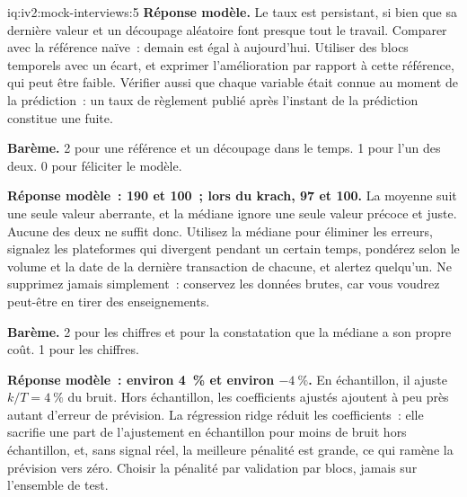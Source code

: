 \begin{solution}{iq:iv2:mock-interviews:5}
\ivstop
\textbf{Réponse modèle.} Le taux est persistant, si bien que sa dernière valeur et un découpage aléatoire font presque tout le travail. Comparer avec la référence naïve~: demain est égal à aujourd'hui. Utiliser des blocs temporels avec un écart, et exprimer l'amélioration par rapport à cette référence, qui peut être faible. Vérifier aussi que chaque variable était connue au moment de la prédiction~: un taux de règlement publié après l'instant de la prédiction constitue une fuite.

\textbf{Barème.} 2 pour une référence et un découpage dans le temps. 1 pour l'un des deux. 0 pour féliciter le modèle.

\ivstop
\textbf{Réponse modèle~: 190 et 100~; lors du krach, 97 et 100.} La moyenne suit une seule valeur aberrante, et la médiane ignore une seule valeur précoce et juste. Aucune des deux ne suffit donc. Utilisez la médiane pour éliminer les erreurs, signalez les plateformes qui divergent pendant un certain temps, pondérez selon le volume et la date de la dernière transaction de chacune, et alertez quelqu'un. Ne supprimez jamais simplement~: conservez les données brutes, car vous voudrez peut-être en tirer des enseignements.

\textbf{Barème.} 2 pour les chiffres et pour la constatation que la médiane a son propre coût. 1 pour les chiffres.

\ivstop
\textbf{Réponse modèle~: environ 4~\% et environ $-4~\%$.} En échantillon, il ajuste $k/T = 4~\%$ du bruit. Hors échantillon, les coefficients ajustés ajoutent à peu près autant d'erreur de prévision. La régression ridge réduit les coefficients~: elle sacrifie une part de l'ajustement en échantillon pour moins de bruit hors échantillon, et, sans signal réel, la meilleure pénalité est grande, ce qui ramène la prévision vers zéro. Choisir la pénalité par validation par blocs, jamais sur l'ensemble de test.


\end{solution}
